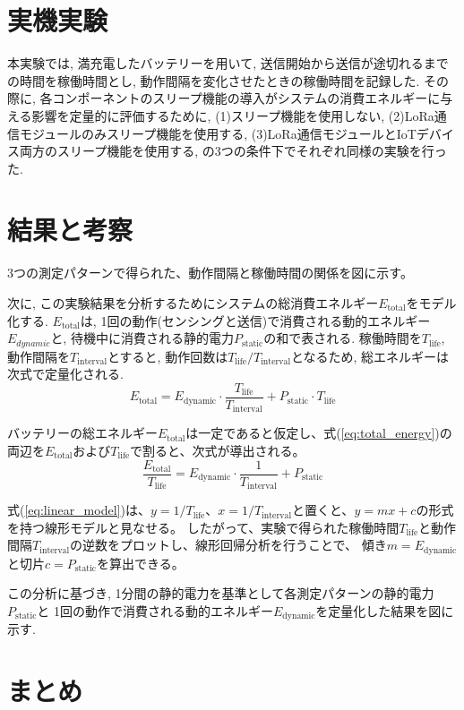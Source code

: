 \documentclass[lualatex, twocolumn]{ltjsarticle}
\begin{document}
\section{実機実験}
本実験では, 満充電したバッテリーを用いて, 送信開始から送信が途切れるまでの時間を稼働時間とし,
動作間隔を変化させたときの稼働時間を記録した. 
その際に, 各コンポーネントのスリープ機能の導入がシステムの消費エネルギーに与える影響を定量的に評価するために,
(1)スリープ機能を使用しない, (2)LoRa通信モジュールのみスリープ機能を使用する, (3)LoRa通信モジュールとIoTデバイス両方のスリープ機能を使用する, の3つの条件下でそれぞれ同様の実験を行った.

\section{結果と考察}
3つの測定パターンで得られた、動作間隔と稼働時間の関係を図に示す。

次に, この実験結果を分析するためにシステムの総消費エネルギー$E_{\mathrm{total}}$をモデル化する. 
$E_{\mathrm{total}}$は, 1回の動作(センシングと送信)で消費される動的エネルギー$E_{dynamic}$と, 
待機中に消費される静的電力$P_{\mathrm{static}}$の和で表される.
稼働時間を$T_{\mathrm{life}}$, 動作間隔を$T_{\mathrm{interval}}$とすると, 動作回数は$T_{\mathrm{life}}/T_{\mathrm{interval}}$となるため, 総エネルギーは次式で定量化される. 
\begin{equation}
    E_{\mathrm{total}} = E_{{\mathrm{dynamic}}} \cdot \frac{T_{\mathrm{life}}}{T_{\mathrm{interval}}} + P_{\mathrm{static}} \cdot T_{\mathrm{life}}
    \label{eq:total_energy}
\end{equation}

バッテリーの総エネルギー$E_{\mathrm{total}}$は一定であると仮定し、式(\ref{eq:total_energy})の両辺を$E_{\mathrm{total}}$および$T_{\mathrm{life}}$で割ると、次式が導出される。
\begin{equation}
  \frac{E_{\mathrm{total}}}{T_{\mathrm{life}}} = E_{\mathrm{dynamic}} \cdot \frac{1}{T_{\mathrm{interval}}} + {P_{\mathrm{static}}}
  \label{eq:linear_model}
\end{equation}

式(\ref{eq:linear_model})は、$y = 1/T_{\mathrm{life}}$、$x = 1/T_{\mathrm{interval}}$と置くと、$y=mx+c$の形式を持つ線形モデルと見なせる。
したがって、実験で得られた稼働時間$T_{\mathrm{life}}$と動作間隔$T_{\mathrm{interval}}$の逆数をプロットし、線形回帰分析を行うことで、
傾き$m=E_{\mathrm{dynamic}}$と切片$c=P_{\mathrm{static}}$を算出できる。

この分析に基づき, 1分間の静的電力を基準として各測定パターンの静的電力$P_{\mathrm{static}}$と
1回の動作で消費される動的エネルギー$E_{\mathrm{dynamic}}$を定量化した結果を図に示す.

\section{まとめ}
\end{document}
